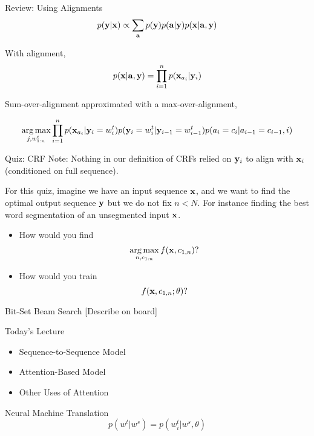 \documentclass{beamer}
\begin{document}
\begin{frame}{Review: Using Alignments}
  \[ p(\mathbf{y} | \mathbf{x}) \propto \sum_{\mathbf{a}} p(\mathbf{y}) p(\mathbf{a} | \mathbf{y}) p(\mathbf{x} |  \mathbf{a}, \mathbf{y})  \]  

  With alignment,
  \[ p(\mathbf{x} |  \mathbf{a}, \mathbf{y})  = \prod_{i=1}^n p(\mathbf{x}_{a_i} | \mathbf{y}_i) \] 

  \air 

  Sum-over-alignment approximated with a max-over-alignment,

  \[ \argmax_{j, w^t_{1:n}} \prod_{i=1}^n p(\boldx_{a_i} | \boldy_i=w^t_i) p(\boldy_i=w^t_i | \boldy_{i-1}=w^t_{i-1}) p(a_i = c_i | a_{i-1}=c_{i-1}, i)   \]  
\end{frame}

\begin{frame}{Quiz: CRF}
  Note: Nothing in our definition of CRFs relied on $\mathbf{y}_i$ to align
  with $\mathbf{x}_i$ (conditioned on full sequence). 

  For this quiz, imagine we have an input sequence $\mathbf{x}$, and we want to 
  find the optimal output sequence $\mathbf{y}$ but we do not fix $n < N$. For instance 
  finding the best word segmentation of an unsegmented input $\mathbf{x}$. 

  \begin{itemize}
  \item How would you find \[ \argmax_{n, c_{1:n}} f(\boldx, c_{1,n}) ?\]

  \item How would you train \[ f(\mathbf{x}, c_{1,n}; \theta) ?\] 
  \end{itemize}
\end{frame}

\begin{frame}{Bit-Set Beam Search}
  [Describe on board] 
\end{frame}


\begin{frame}{Today's Lecture}
  \begin{itemize}
  \item Sequence-to-Sequence Model
    \air
  \item Attention-Based Model
    \air
  \item Other Uses of Attention
  \end{itemize}
\end{frame}

\begin{frame}{Neural Machine Translation}
  \[ p(w^t | w^s) = p(w^t_i | w^s, \theta)  \] 
\end{frame}
\end{document}
